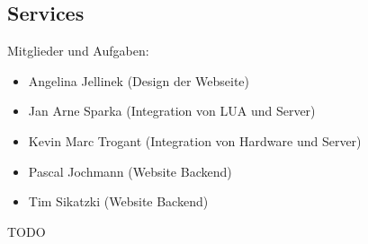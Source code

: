 \subsection{Services}
\label{services}

Mitglieder und Aufgaben:
\begin{itemize}
  \item
    Angelina Jellinek (Design der Webseite)
  \item
    Jan Arne Sparka (Integration von LUA und Server)
  \item
    Kevin Marc Trogant (Integration von Hardware und Server)
  \item
    Pascal Jochmann (Website Backend)
  \item
    Tim Sikatzki (Website Backend)
\end{itemize}
TODO
